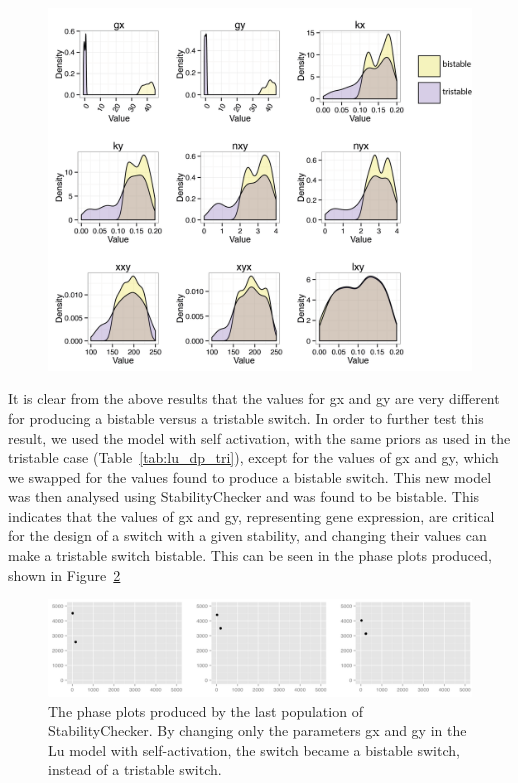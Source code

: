 \begin{figure}[p]
\centering
\includegraphics[scale=0.8]{images/design_principles/res_all_tri_biyp.png}
\caption{}
\label{fig:lu_bi_tri}
\end{figure}

It is clear from the above results that the values for gx and gy are very different for producing a bistable versus a tristable switch. In order to further test this result, we used the model with self activation, with the same priors as used in the tristable case (Table~\ref{tab:lu_dp_tri}), except for the values of gx and gy, which we swapped for the values found to produce a bistable switch. This new model was then analysed using StabilityChecker and was found to be bistable. This indicates that the values of gx and gy, representing gene expression, are critical for the design of a switch with a given stability, and changing their values can make a tristable switch bistable. This can be seen in the phase plots produced, shown in Figure~\ref{fig:lu_bi_tri}

\begin{figure}[p]
\centering
\includegraphics[scale=0.4]{images/Lu/tri/phase_plot_tri_bi.png}
\caption{The phase plots produced by the last population of StabilityChecker. By changing only the parameters gx and gy in the Lu model with self-activation, the switch became a bistable switch, instead of a tristable switch.}
\label{fig:lu_bi_tri}
\end{figure}


